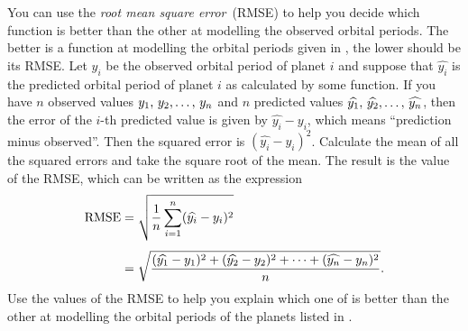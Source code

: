 \documentclass[a4paper,oneside,12pt]{article}
\begin{document}
\begin{problem}
\begin{packedenum}
  \item\label{subprob:planetary_orbit_RMS_error}
    You can use the \emph{root mean square error}~(RMSE) to help you
    decide which function is better than the other at modelling the
    observed orbital periods.  The better is a function at modelling
    the orbital periods given in ,
    the lower should be its RMSE.  Let $y_i$ be the observed orbital
    period of planet $i$ and suppose that $\widehat{y_i}$ is the
    predicted orbital period of planet $i$ as calculated by some
    function.  If you have $n$ observed values ${y_1},\, {y_2}, \dots,\, {y_n}$
    and $n$ predicted values
    ${\widehat{y_1}},\, {\widehat{y_2}}, \dots,\, {\widehat{y_n}}$, then the
    error of the $i$-th predicted value is given by
    $\widehat{y_i} - y_i$, which means ``prediction minus observed''.
    Then the squared error is $(\widehat{y_i} - y_i)^2$.  Calculate
    the mean of all the squared errors and take the square root of the
    mean.  The result is the value of the RMSE, which can be written
    as the expression
    \begin{align*}
    \text{RMSE}
    &=
    \sqrt{
      \frac{1}{n}
      \sum_{i=1}^n (\widehat{y_i} - y_i)^2
    } \\[4pt]
    &=
    \sqrt{
      \frac{
        {
          (\widehat{y_1} - y_1)^2
        } + {
          (\widehat{y_2} - y_2)^2
        } + \cdots + {
          (\widehat{y_n} - y_n)^2
        }
      }{
        n
      }
    }.
    \end{align*}
    Use the values of the RMSE to help you explain which one of
    is better than the other at modelling the orbital periods of the
    planets listed in .
  \end{packedenum}
\end{problem}
\end{document}
